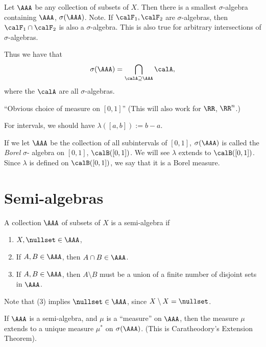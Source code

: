 \documentclass{article}
\begin{document}
Let $\AAA$ be any collection of subsets of $X$. Then there is a 
smallest $\sigma$-algebra containing $\AAA$, $\sigma(\AAA)$. Note. If 
$\calF_1,\calF_2$ are $\sigma$-algebras, then 
$\calF_1\cap \calF_2$ is also a $\sigma$-algebra. This is also
true for arbitrary intersections of $\sigma$-algebras.

Thus we have that
\[ \sigma(\AAA) = \bigcap_{\calA \supseteq \AAA} \calA, \]
where the $\calA$ are all $\sigma$-algebras.

\begin{example}
    ``Obvious choice of measure on $[0,1]$''
    (This will also work for $\RR$, $\RR^n$.)

    For intervals, we should have $\lambda([a,b]) := b-a$.

    If we let $\AAA$ be the collection of all subintervals of
    $[0,1]$, $\sigma(\AAA)$ is called the \emph{Borel} $\sigma$-
    algebra on $[0,1]$, $\calB([0,1])$.
    We will see $\lambda$ extends to $\calB([0,1])$.
    Since $\lambda$ is defined on $\calB([0,1])$, we say 
    that it is a Borel measure.
\end{example}

\section{Semi-algebras}

\begin{definition}
    A collection $\AAA$ of subsets of $X$ is a semi-algebra if 
    \begin{enumerate}
        \item $X,\nullset\in\AAA$,
        \item If $A,B\in\AAA$, then $A\cap B\in \AAA$.
        \item If $A,B\in \AAA$, then $A\setminus B$ must be a
            union of a finite number of disjoint sets in 
            $\AAA$.
    \end{enumerate}

    Note that (3) implies $\nullset\in \AAA$, 
    since $X\setminus X =\nullset$.
\end{definition}

If $\AAA$ is a semi-algebra, and $\mu$ is a ``measure'' on 
$\AAA$, then the measure $\mu$ extends to a unique measure
$\mu^*$ on $\sigma(\AAA)$. %
(This is Caratheodory's Extension Theorem).
\end{document}
